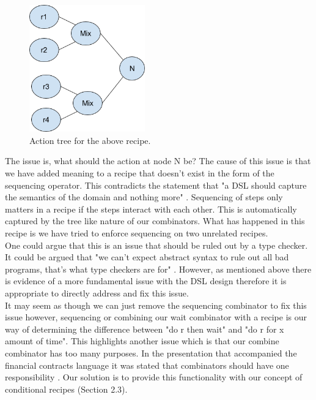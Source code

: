 \documentclass[11pt]{article}
\begin{document}
    \begin{figure}[ht]
        \centering
            \includegraphics[width=5cm,keepaspectratio]{issue1.png}
        \caption{Action tree for the above recipe.}
    \end{figure}

    The issue is, what should the action at node N be? The cause of this issue is
    that we have added meaning to a recipe that doesn't exist in the form of the sequencing
    operator. This contradicts the statement that "a DSL should capture the semantics of the
    domain and nothing more" \cite{hudak}. Sequencing of steps only matters in a recipe if
    the steps interact with each other. This is automatically captured by the tree like nature
    of our combinators. What has happened in this recipe is we have tried to enforce sequencing
    on two unrelated recipes. \\

    One could argue that this is an issue that should be ruled out by a type checker. It could be
    argued that "we can’t expect abstract syntax to rule out all bad programs, that’s what type
    checkers are for" \cite{core}. However, as mentioned above there is evidence of a more fundamental
    issue with the DSL design therefore it is appropriate to directly address and fix this issue. \\
    
    It may seem as though we can just remove the sequencing combinator to fix this issue however,
    sequencing or combining our wait combinator with a recipe is our way of determining the
    difference between "do r then wait" and "do r for x amount of time". This highlights another
    issue which is that our combine combinator has too many purposes. In the presentation that
    accompanied the financial contracts language it was stated that combinators should have
    one responsibility \cite{contracts-pp}. Our solution is to provide this functionality 
    with our concept of conditional recipes (Section 2.3).
\end{document}
